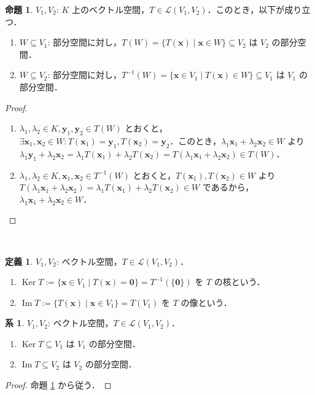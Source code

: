 \documentclass{jlreq}
\theoremstyle{definition}
\newtheorem{dfn}[thm]{定義}
\newtheorem{prop}[thm]{命題}
\newtheorem{cor}[thm]{系}
\DeclareMathOperator{\Ker}{Ker}
\DeclareMathOperator{\Img}{Im}
\begin{document}
      \begin{prop}\label{image-and-preimage-of-subspace-is-subspace}
        $V_1, V_2$: $K$ 上のベクトル空間，$T \in \mathcal{L}(V_1,V_2)$．このとき，以下が成り立つ．
        \begin{enumerate}
          \item $W \subseteq V_1$: 部分空間に対し，$T(W)=\{T(\bm{x}) \mid \bm{x} \in W\} \subseteq V_2$ は $V_2$ の部分空間．
          \item $W \subseteq V_2$: 部分空間に対し，$T^{-1}(W)=\{\bm{x} \in V_1 \mid T(\bm{x}) \in W\} \subseteq V_1$ は $V_1$ の部分空間．
        \end{enumerate}
      \end{prop}
      \begin{proof}
        \mbox{}
        \begin{enumerate}
          \item $\lambda_1,\lambda_2 \in K, \bm{y}_1,\bm{y}_2 \in T(W)$ とおくと，$\exists \bm{x}_1,\bm{x}_2 \in W: T(\bm{x}_1)=\bm{y}_1,T(\bm{x}_2)=\bm{y}_2$．このとき，$\lambda_1\bm{x}_1+\lambda_2\bm{x}_2 \in W$ より $\lambda_1\bm{y}_1+\lambda_2\bm{x}_2=\lambda_1T(\bm{x}_1)+\lambda_2T(\bm{x}_2)=T(\lambda_1\bm{x}_1+\lambda_2\bm{x}_2) \in T(W)$．
          \item $\lambda_1,\lambda_2 \in K, \bm{x}_1,\bm{x}_2 \in T^{-1}(W)$ とおくと，$T(\bm{x}_1),T(\bm{x}_2) \in W$ より $T(\lambda_1\bm{x}_1+\lambda_2\bm{x}_2)=\lambda_1T(\bm{x}_1)+\lambda_2T(\bm{x}_2) \in W$ であるから，$\lambda_1\bm{x}_1+\lambda_2\bm{x}_2 \in W$．
        \end{enumerate}
      \end{proof}　　
      \begin{dfn}
        $V_1, V_2$: ベクトル空間，$T \in \mathcal{L}(V_1,V_2)$．
        \begin{enumerate}
          \item $\Ker T := \{\bm{x} \in V_1 \mid T(\bm{x})=\bm{0}\} = T^{-1}(\{\bm{0}\})$ を $T$ の核という．
          \item $\Img T := \{T(\bm{x}) \mid \bm{x} \in V_1\} = T(V_1)$ を $T$ の像という．
        \end{enumerate}
      \end{dfn}
      \begin{cor}
        $V_1,V_2$: ベクトル空間，$T \in \mathcal{L}(V_1,V_2)$．
        \begin{enumerate}
          \item $\Ker T \subseteq V_1$ は $V_1$ の部分空間．
          \item $\Img T \subseteq V_2$ は $V_2$ の部分空間．
        \end{enumerate}
      \end{cor}
      \begin{proof}
        命題 \ref{image-and-preimage-of-subspace-is-subspace} から従う．
      \end{proof}
\end{document}
